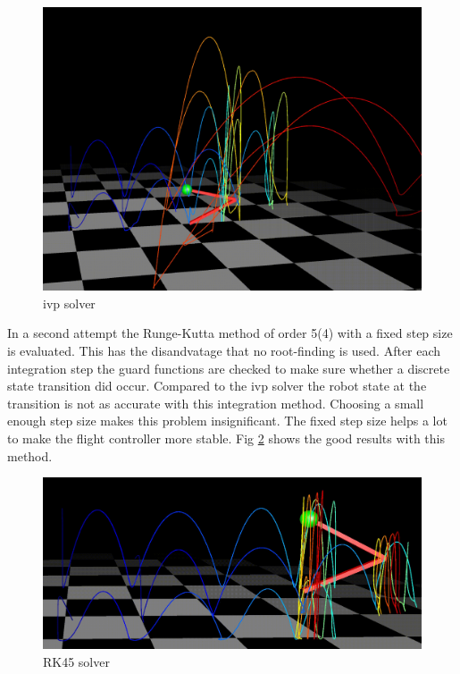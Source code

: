 \documentclass[10pt, conference]{IEEEtran}
\begin{document}
\begin{figure}[h]
   \centering
   \includegraphics[scale=0.11]{"assets/solver_ivp.png"}
   \caption{ivp solver}
   \label{fig:ivp solver}
\end{figure}

In a second attempt the Runge-Kutta method of order 5(4) with a fixed step size is evaluated. This has the disandvatage that no root-finding is used. After each 
integration step the guard functions are checked to make sure whether a discrete state transition did occur. Compared to the ivp solver the robot state at the 
transition is not as accurate with this integration method. Choosing a small enough step size makes this problem insignificant. The fixed step size helps a lot 
to make the flight controller more stable. Fig \ref{fig:RK45 solver} shows the good results with this method.

\begin{figure}[h]
   \centering
   \includegraphics[scale=0.074]{"assets/solver_rk45.png"}
   \caption{RK45 solver}
   \label{fig:RK45 solver}
\end{figure}
\end{document}
